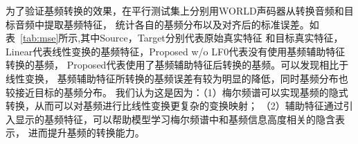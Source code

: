 为了验证基频转换的效果，在平行测试集上分别用WORLD声码器从转换音频和目标音频中提取基频特征，
统计各自的基频分布以及对齐后的标准误差。如表~\ref{tab:mse}所示,其中Source，Target分别代表原始真实特征
和目标真实特征，Linear代表线性变换的基频特征，Proposed w/o LF0代表没有使用基频辅助特征转换的基频，
Proposed代表使用了基频辅助特征后转换的基频。可以发现相比于线性变换，
基频辅助特征所转换的基频误差有较为明显的降低，同时基频分布也较接近目标的基频分布。
我们认为这是因为：（1）梅尔频谱可以实现基频的隐式转换，从而可以对基频进行比线性变换更复杂的变换映射；
（2）辅助特征通过引入显示的基频特征，可以帮助模型学习梅尔频谱中和基频信息高度相关的隐含表示，
进而提升基频的转换能力。


